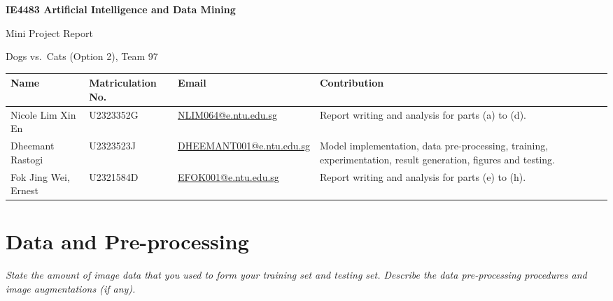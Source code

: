 \documentclass[11pt,a4paper]{article}
\newenvironment{question}
  {\par\smallskip\noindent\begin{lrbox}{\questionbox}%
   \begin{minipage}{\dimexpr\linewidth-2\fboxsep-2\fboxrule\relax}\small\itshape}
  {\end{minipage}\end{lrbox}%
   \fcolorbox{gray!45}{gray!7}{\usebox{\questionbox}}\par\smallskip}
\begin{document}
\begin{center}
  {\Large\bfseries IE4483 Artificial Intelligence and Data Mining\par}
  \vspace{0.4em}
  {\LARGE Mini Project Report\par}
  \vspace{0.4em}
  {\large Dogs vs.\ Cats (Option 2), Team 97\par}
\end{center}

\vspace{0.6em}
\begin{table}[ht]
  \centering
  \small
  \begin{tabularx}{\textwidth}{@{}l l l >{\raggedright\arraybackslash}X@{}}
    \toprule
    Name & Matriculation No. & Email & Contribution \\
    \midrule
    Nicole Lim Xin En      & U2323352G & \href{mailto:NLIM064@e.ntu.edu.sg}{NLIM064@e.ntu.edu.sg} & Report writing and analysis for parts (a) to (d). \\
    Dheemant Rastogi       & U2323523J & \href{mailto:dheemant001@e.ntu.edu.sg}{DHEEMANT001@e.ntu.edu.sg} & Model implementation, data pre-processing, training, experimentation, result generation, figures and testing. \\
    Fok Jing Wei, Ernest   & U2321584D & \href{mailto:EFOK001@e.ntu.edu.sg}{EFOK001@e.ntu.edu.sg} & Report writing and analysis for parts (e) to (h). \\
    \bottomrule
  \end{tabularx}
\end{table}


\vspace{-0.5em}
{\small\tableofcontents}

\clearpage

\section{Data and Pre-processing}\label{sec:a}

\begin{question}
State the amount of image data that you used to form your training set and testing set. Describe the data pre-processing procedures and image augmentations (if any).
\end{question}
\end{document}
